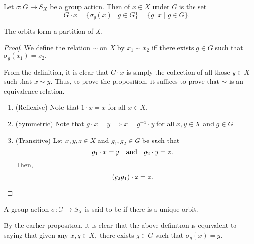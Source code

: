 
\begin{defn}%
	Let $\sigma : G \to S_X$ be a group action. Then  of $x \in X$ under $G$ is the set
	\begin{equation*} 
		G \cdot x = \{\sigma_g(x) \mid g \in G\} = \{g \cdot x \mid g \in G\}.
	\end{equation*}
\end{defn}

\begin{prop} \label{prop:orbitspartitionX}
	The orbits form a partition of $X.$
\end{prop}
\begin{proof} 
	We define the relation $\sim$ on $X$ by $x_1 \sim x_2$ iff there exists $g \in G$ such that $\sigma_g(x_1) = x_2.$

	From the definition, it is clear that $G \cdot x$ is simply the collection of all those $y \in X$ such that $x \sim y.$ Thus, to prove the proposition, it suffices to prove that $\sim$ is an equivalence relation. 

	\begin{enumerate}
		\item (Reflexive) Note that $1 \cdot x = x$ for all $x \in X.$
		\item (Symmetric) Note that $g \cdot x = y \implies x = g^{-1} \cdot y$ for all $x, y \in X$ and $g \in G.$
		\item (Transitive) Let $x, y, z \in X$ and $g_1, g_2 \in G$ be such that
		\begin{equation*} 
			g_1 \cdot x = y \quad\text{and}\quad g_2 \cdot y = z.
		\end{equation*}
		Then,
		\begin{equation*} 
			(g_2g_1) \cdot x = z. \qedhere
		\end{equation*}
	\end{enumerate}
\end{proof}

\begin{defn}%
	A group action $\sigma : G \to S_X$ is said to be  if there is a unique orbit.
\end{defn}

\begin{rem}
	By the earlier proposition, it is clear that the above definition is equivalent to saying that given any $x, y \in X,$ there exists $g \in G$ such that $\sigma_g(x) = y.$
\end{rem}

